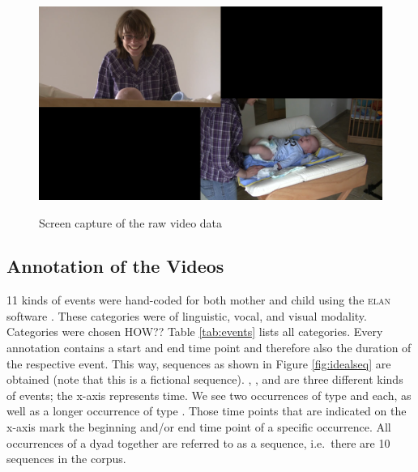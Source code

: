 \begin{figure}[h]
	\centering 
	\includegraphics[width=\imgwidth]{../img/raw_video_vp_08.png}
	\label{fig:rawvid}
	\caption{Screen capture of the raw video data}
\end{figure}

\subsection{Annotation of the Videos}
11 kinds of events were hand-coded for both mother and child using the \textsc{elan} software \citep{wittenburg06}. These categories were of linguistic, vocal, and visual modality. Categories were chosen HOW??  %
Table \ref{tab:events} lists all categories. Every annotation contains a start and end time point and therefore also the duration of the respective event. This way, sequences as shown in Figure \ref{fig:idealseq} are obtained (note that this is a fictional sequence). , , and  are three different kinds of events; the x-axis represents time. We see two occurrences of type  and  each, as well as a longer occurrence of type . Those time points that are indicated on the x-axis mark the beginning and/or end time point of a specific occurrence. All occurrences of a dyad together are referred to as a sequence, i.e.\ there are 10 sequences in the corpus.

